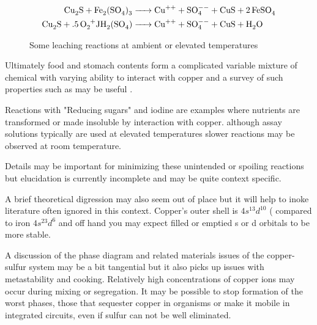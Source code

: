 \begin{figure}[ht]
\begin{align}
\cee{Cu_{2}S +Fe_2(SO_4)_3  & -> Cu^{++} + SO^{--}_4 + CuS + 2FeSO_4  } \\
\cee{Cu_{2}S +.5O_2+JH_2(SO_4)  & -> Cu^{++} + SO^{--}_4 + CuS + H_2O  } \\
\end{align}
\caption{ \label{fig:leachers} Some leaching reactions
\cite{Schlesinger_King_Sole_Hydrometallurgical_Copper_Extraction_2011}
 at ambient or elevated temperatures  }
\end{figure}

Ultimately food and stomach contents form a complicated variable
mixture of chemical with varying ability to interact with copper
and a survey of such properties such as 
\cite{Manceau_Matynia_nature_2010} may be useful .



Reactions with "Reducing sugars"
and iodine are examples where nutrients are transformed
or made insoluble by interaction with copper. although
assay solutions typically are used at elevated temperatures
slower reactions may be observed at room temperature.

Details may be important for minimizing these unintended
or spoiling reactions but elucidation is currently incomplete
and may be quite context specific. 


A brief theoretical digression may also seem out of place
but it will help to inoke literature often ignored in this
context. 
Copper's outer shell is $4s^13d^{10}$
( compared to iron $4s^23d^6$
and off hand you may expect filled or emptied s or d orbitals
to be more stable. 
 

A discussion of the phase diagram and related materials
issues of the copper-sulfur system may be a bit tangential
but it also picks up issues with metastability and cooking.
Relatively high concentrations of copper ions may occur during
mixing or segregation.
It may be possible to stop formation of the worst phases,
those that sequester copper in organisms or make it
mobile in integrated circuits, even if sulfur can not
be well eliminated. 

